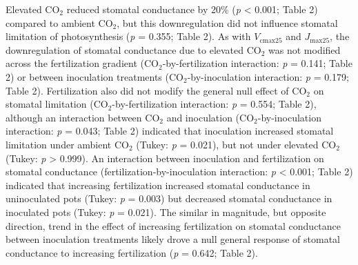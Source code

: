 Elevated CO$_2$ reduced stomatal conductance by 20\% (\textit{p} < 0.001; Table 2) compared to ambient CO$_2$, but this downregulation did not influence stomatal limitation of photosynthesis (\textit{p} = 0.355; Table 2). As with $V_\mathrm{cmax25}$ and $J_\mathrm{max25}$, the downregulation of stomatal conductance due to elevated CO$_2$ was not modified across the fertilization gradient (CO$_2$-by-fertilization interaction: \textit{p} = 0.141; Table 2) or between inoculation treatments (CO$_2$-by-inoculation interaction: \textit{p} = 0.179; Table 2). Fertilization also did not modify the general null effect of CO$_2$ on stomatal limitation (CO$_2$-by-fertilization interaction: \textit{p} = 0.554; Table 2), although an interaction between CO$_2$ and inoculation (CO$_2$-by-inoculation interaction: \textit{p} = 0.043; Table 2) indicated that inoculation increased stomatal limitation under ambient CO$_2$ (Tukey: \textit{p} = 0.021), but not under elevated CO$_2$ (Tukey: \textit{p} > 0.999). An interaction between inoculation and fertilization on stomatal conductance (fertilization-by-inoculation interaction: \textit{p} < 0.001; Table 2) indicated that increasing fertilization increased stomatal conductance in uninoculated pots (Tukey: \textit{p} = 0.003) but decreased stomatal conductance in inoculated pots (Tukey: \textit{p} = 0.021). The similar in magnitude, but opposite direction, trend in the effect of increasing fertilization on stomatal conductance between inoculation treatments likely drove a null general response of stomatal conductance to increasing fertilization (\textit{p} = 0.642; Table 2).

